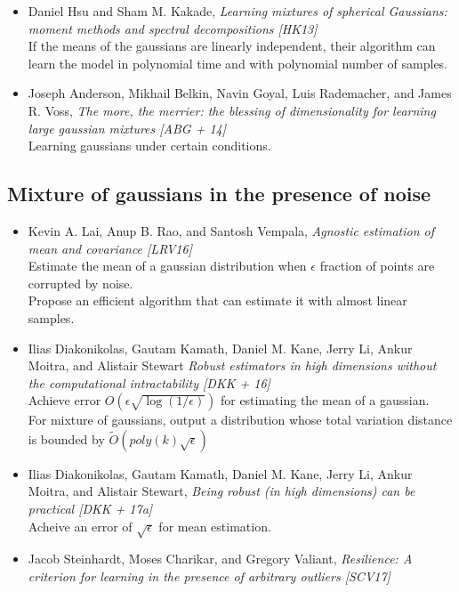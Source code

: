 \documentclass[12pt]{article}
\begin{document}
\begin{itemize}
	\item Daniel Hsu and Sham M. Kakade, {\em Learning mixtures of spherical Gaussians: moment methods and spectral decompositions [HK13]}\\
	If the  means  of  the  gaussians  are  linearly  independent,  their algorithm can learn the model in polynomial time and with polynomial number of samples.
	
	\item Joseph Anderson, Mikhail Belkin, Navin Goyal, Luis Rademacher, and James R. Voss, {\em The more, the merrier: the blessing of dimensionality for learning large gaussian mixtures [ABG + 14]}\\
	Learning gaussians under certain conditions.		
\end{itemize}
	
\subsection{Mixture of gaussians in the presence of noise}
\begin{itemize}
	\item Kevin A. Lai, Anup B. Rao, and Santosh Vempala, {\em Agnostic estimation of mean and covariance [LRV16]}\\
	Estimate the mean of a gaussian distribution when $\epsilon$ fraction of points are corrupted by noise.\\
	Propose an efficient algorithm that can estimate it with almost linear samples.
	
	\item Ilias Diakonikolas, Gautam Kamath, Daniel M. Kane, Jerry Li, Ankur Moitra, and Alistair Stewart {\em Robust estimators in high dimensions without the computational intractability [DKK + 16]}\\
	Achieve error $O(\epsilon\sqrt{\log (1/\epsilon)})$ for estimating the mean of a gaussian.\\
	For mixture of gaussians, output a distribution whose total variation distance is bounded by $\tilde O(poly(k)\sqrt\epsilon)$ 
	
	\item Ilias Diakonikolas, Gautam Kamath, Daniel M. Kane, Jerry Li, Ankur Moitra, and
Alistair Stewart, {\em Being robust (in high dimensions) can be practical [DKK + 17a]}\\
	Acheive an error of $\sqrt\epsilon$ for mean estimation.
	
	\item Jacob Steinhardt, Moses Charikar, and Gregory Valiant, {\em Resilience: A criterion for
learning in the presence of arbitrary outliers [SCV17]}\\
	
\end{itemize}
\end{document}
